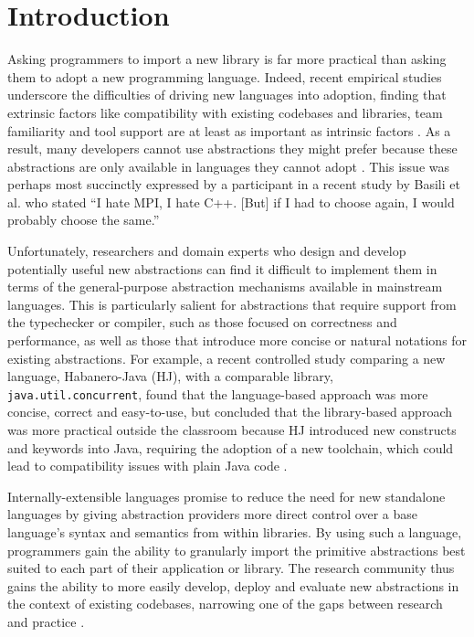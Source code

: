 \documentclass[9pt,preprint]{sigplanconf}
\begin{document}
\section{Introduction}\label{intro}
Asking programmers to import a new library is far more practical than asking them to  adopt a new programming language. Indeed, recent empirical studies underscore  the difficulties of driving new languages into adoption, finding that extrinsic factors like compatibility with existing codebases and libraries, team familiarity and tool support are at least as important as intrinsic factors \cite{Meyerovich:2013:EAP:2509136.2509515,chen05,nguyen2010survey}. As a result, many developers cannot use  abstractions they might prefer because these abstractions are only available in languages they cannot adopt \cite{Meyerovich:2012:SDR:2414721.2414724,Meyerovich:2013:EAP:2509136.2509515}. This issue was perhaps most succinctly expressed by a participant in a recent study by Basili et al. \cite{basili2008understanding} who stated ``I hate MPI, I hate C++. [But] if I had to choose again, I would probably choose the same.''

Unfortunately, researchers and domain experts who design and develop potentially useful new abstractions can find it difficult to implement them in terms of the general-purpose abstraction mechanisms available in mainstream languages. This is particularly salient for abstractions that require support from the typechecker or compiler, such as those focused on correctness and performance, as well as those that  introduce more concise or natural notations for existing abstractions. For example, a recent controlled study comparing a new language, Habanero-Java (HJ), with a comparable library, \verb|java.util.concurrent|, found that the language-based approach was more concise, correct and easy-to-use, but concluded that the library-based approach was more practical outside the classroom because HJ introduced new constructs and keywords into Java, requiring the adoption of a new toolchain, which could lead to compatibility issues with plain Java code \cite{cave2010comparing}.

Internally-extensible languages promise to reduce the need for new standalone languages by giving abstraction providers more direct control over a base language's syntax and semantics from within libraries. By using such a language, programmers  gain the ability to granularly import the primitive abstractions best suited to each part of their application or library. The research community thus gains the ability to more easily develop, deploy and evaluate new abstractions in the context of existing codebases, narrowing one of the gaps between research and practice \cite{basili2008understanding}. 
\end{document}
